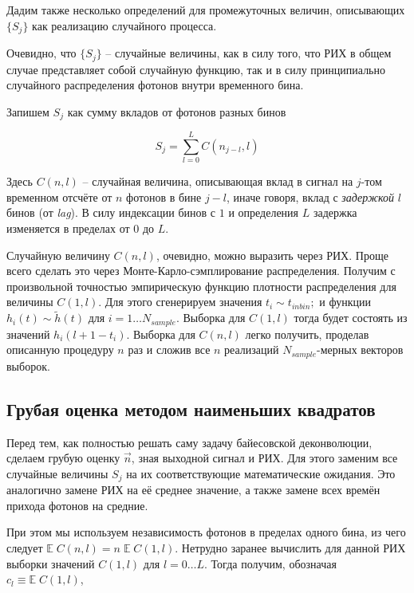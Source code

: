 \documentclass[12pt]{article}
\begin{document}
	Дадим также несколько определений для промежуточных величин, описывающих $\{ S_j \}$ как реализацию случайного процесса.

	Очевидно, что $\{ S_j \}$ -- случайные величины, как в силу того, что РИХ в общем случае представляет собой случайную функцию, так и в силу принципиально случайного распределения фотонов внутри временного бина.
	
	Запишем $S_j$ как сумму вкладов от фотонов разных бинов
	
	\begin{equation}
		S_j = \sum_{l=0}^{L} C(n_{j-l}, l)
		\label{eq:sum_breakdown}
	\end{equation}

	Здесь $C(n, l)$ -- случайная величина, описывающая вклад в сигнал на $j$-том временном отсчёте от $n$ фотонов в бине $j - l$, иначе говоря, вклад с \textit{задержкой} $l$ бинов (от \textit{lag}). В силу индексации бинов с $1$ и определения $L$ задержка изменяется в пределах от $0$ до $L$.
	
	Случайную величину $C(n, l)$, очевидно, можно выразить через РИХ. Проще всего сделать это через Монте-Карло-сэмплирование распределения. Получим с произвольной точностью эмпирическую функцию плотности распределения для величины $C(1, l)$. Для этого сгенерируем значения $t_i \sim t_{inbin};$ и функции $h_i(t) \sim \tilde{h}(t)$ для $i = 1 \ldots N_{sample}$. Выборка для $C(1, l)$ тогда будет состоять из значений $h_i(l + 1 - t_i)$. Выборка для $C(n, l)$ легко получить, проделав описанную процедуру $n$ раз и сложив все $n$ реализаций $N_{sample}$-мерных векторов выборок.

	\subsection{Грубая оценка методом наименьших квадратов}
	
	Перед тем, как полностью решать саму задачу байесовской деконволюции, сделаем грубую оценку $\vec{n}$, зная выходной сигнал и РИХ. Для этого заменим все случайные величины $S_j$ на их соответствующие математические ожидания. Это аналогично замене РИХ на её среднее значение, а также замене всех времён прихода фотонов на средние.
	
	При этом мы используем независимость фотонов в пределах одного бина, из чего следует $ \mathbb{E} \; C(n, l) = n \; \mathbb{E} \; C(1, l)$. Нетрудно заранее вычислить для данной РИХ выборки значений $C(1, l)$ для $l = 0 \ldots L$. Тогда получим, обозначая $c_l \equiv \mathbb{E} \; C(1, l)$,
	
\end{document}
